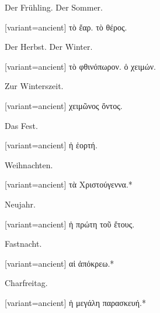 Der Frühling. Der Sommer.

\switchcolumn

\begin{greek}[variant=ancient]%
τὸ ἔαρ. τὸ θέρος.

\end{greek}%
\switchcolumn*

Der Herbst. Der Winter.

\switchcolumn

\begin{greek}[variant=ancient]%
τὸ φθινόπωρον. ὁ χειμών.

\end{greek}%
\switchcolumn*

Zur Winters\textcompwordmark{}zeit.

\switchcolumn

\begin{greek}[variant=ancient]%
χειμῶνος ὄντος.

\end{greek}%
\switchcolumn*

Das Fest.

\switchcolumn

\begin{greek}[variant=ancient]%
ἡ ἑορτή.

\end{greek}%
\switchcolumn*

Weihnachten.

\switchcolumn

\begin{greek}[variant=ancient]%
τὰ Χριστούγεννα.{*}

\end{greek}%
\switchcolumn*

Neujahr.

\switchcolumn

\begin{greek}[variant=ancient]%
ἡ πρώτη τοῦ ἔτους.

\end{greek}%
\switchcolumn*

Fastnacht.

\switchcolumn

\begin{greek}[variant=ancient]%
αἱ ἀπόκρεω.{*}

\end{greek}%
\switchcolumn*

Charfreitag.

\switchcolumn

\begin{greek}[variant=ancient]%
ἡ μεγάλη παρασκευή.{*}

\end{greek}%
\switchcolumn*

